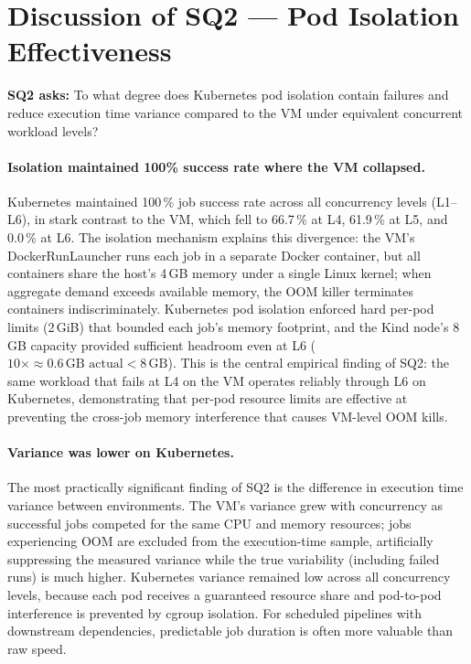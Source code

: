 
\section{Discussion of SQ2 --- Pod Isolation Effectiveness}
\label{sec:discuss-sq2}

\textbf{SQ2 asks:} To what degree does Kubernetes pod isolation contain failures and reduce execution time variance compared to the VM under equivalent concurrent workload levels?

\paragraph{Isolation maintained 100\% success rate where the VM collapsed.}
Kubernetes maintained 100\,\% job success rate across all concurrency levels (L1--L6), in stark contrast to the VM, which fell to 66.7\,\% at L4, 61.9\,\% at L5, and 0.0\,\% at L6.
The isolation mechanism explains this divergence: the VM's DockerRunLauncher runs each job in a separate Docker container, but all containers share the host's 4\,GB memory under a single Linux kernel; when aggregate demand exceeds available memory, the OOM killer terminates containers indiscriminately.
Kubernetes pod isolation enforced hard per-pod limits (2\,GiB) that bounded each job's memory footprint, and the Kind node's 8\,GB capacity provided sufficient headroom even at L6 ($10 \times \approx 0.6\,\text{GB actual} < 8\,\text{GB}$).
This is the central empirical finding of SQ2: the same workload that fails at L4 on the VM operates reliably through L6 on Kubernetes, demonstrating that per-pod resource limits are effective at preventing the cross-job memory interference that causes VM-level OOM kills.

\paragraph{Variance was lower on Kubernetes.}
The most practically significant finding of SQ2 is the difference in execution time variance between environments.
The VM's variance grew with concurrency as successful jobs competed for the same CPU and memory resources; jobs experiencing OOM are excluded from the execution-time sample, artificially suppressing the measured variance while the true variability (including failed runs) is much higher.
Kubernetes variance remained low across all concurrency levels, because each pod receives a guaranteed resource share and pod-to-pod interference is prevented by cgroup isolation.
For scheduled pipelines with downstream dependencies, predictable job duration is often more valuable than raw speed.

